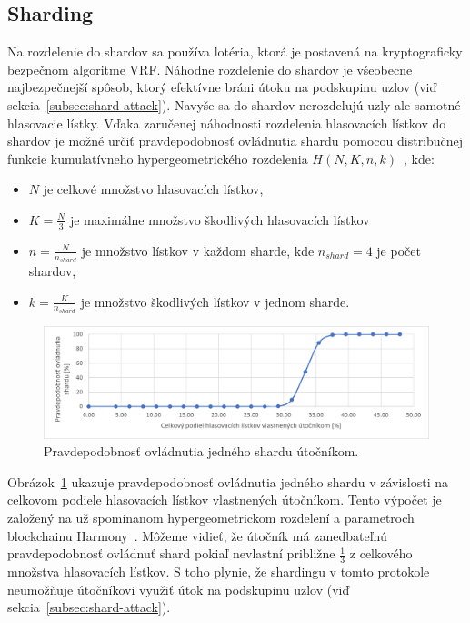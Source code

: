 \subsection{Sharding}
Na rozdelenie do shardov sa používa lotéria, ktorá je postavená na kryptograficky bezpečnom algoritme VRF. Náhodne rozdelenie do shardov je všeobecne najbezpečnejší spôsob, ktorý efektívne bráni útoku na podskupinu uzlov (viď sekcia~\ref{subsec:shard-attack}). Navyše sa do shardov nerozdeľujú uzly ale samotné hlasovacie lístky. Vďaka zaručenej náhodnosti rozdelenia hlasovacích lístkov do shardov je možné určiť pravdepodobnosť ovládnutia shardu pomocou distribučnej funkcie kumulatívneho hypergeometrického rozdelenia $H(N,K,n,k)$~\cite{rice2006mathematical, harmonyWp}, kde:
\begin{itemize}
	\item $N$ je celkové množstvo hlasovacích lístkov,
	\item $K = \frac{N}{3}$ je maximálne množstvo škodlivých hlasovacích lístkov
	\item $n = \frac{N}{n_{shard}}$ je množstvo lístkov v každom sharde, kde $n_{shard} = 4$ je počet shardov,
	\item $k = \frac{K}{n_{shard}}$ je množstvo škodlivých lístkov v jednom sharde.
\end{itemize}

\begin{figure}[bt]
	\centering
	\includegraphics[width=\textwidth]{obrazky-figures/hypergeom-dist}
	\caption{Pravdepodobnosť ovládnutia jedného shardu útočníkom.}
	\label{img:hypergeom-dist}
\end{figure}

Obrázok~\ref{img:hypergeom-dist} ukazuje pravdepodobnosť ovládnutia jedného shardu v závislosti na celkovom podiele hlasovacích lístkov vlastnených útočníkom. Tento výpočet je založený na už spomínanom hypergeometrickom rozdelení a parametroch blockchainu Harmony~\cite{harmonyWp}. Môžeme vidieť, že útočník má zanedbateľnú pravdepodobnosť ovládnuť shard pokiaľ nevlastní približne $\frac{1}{3}$ z celkového množstva hlasovacích lístkov. S toho plynie, že shardingu v tomto protokole neumožňuje útočníkovi využiť útok na podskupinu uzlov (viď sekcia~\ref{subsec:shard-attack}).


